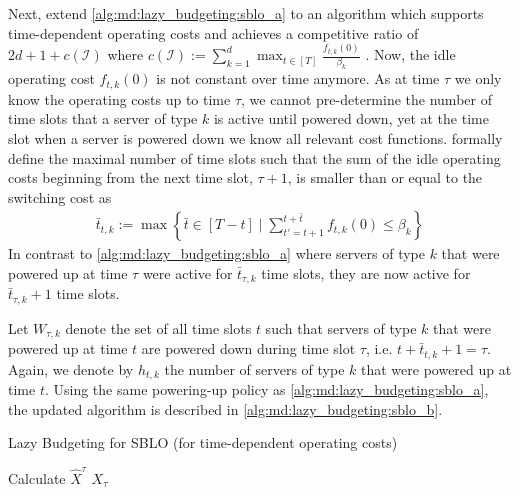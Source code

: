 Next, \citeauthor*{Albers2021_2} extend \autoref{alg:md:lazy_budgeting:sblo_a} to an algorithm which supports time-dependent operating costs and achieves a competitive ratio of $2d + 1 + c(\mathcal{I})$ where $c(\mathcal{I}) := \sum_{k=1}^d \max_{t \in [T]} \frac{f_{t,k}(0)}{\beta_k}$ \cite{Albers2021_2}. Now, the idle operating cost $f_{t,k}(0)$ is not constant over time anymore. As at time $\tau$ we only know the operating costs up to time $\tau$, we cannot pre-determine the number of time slots that a server of type $k$ is active until powered down, yet at the time slot when a server is powered down we know all relevant cost functions. \citeauthor*{Albers2021_2} formally define the maximal number of time slots such that the sum of the idle operating costs beginning from the next time slot, $\tau+1$, is smaller than or equal to the switching cost as \begin{align*}
    \bar{t}_{t,k} := \max \left\{\bar{t} \in [T - t] \mid \sum_{t' = t+1}^{t+\bar{t}} f_{t,k}(0) \leq \beta_k\right\}
\end{align*} In contrast to \autoref{alg:md:lazy_budgeting:sblo_a} where servers of type $k$ that were powered up at time $\tau$ were active for $\bar{t}_{\tau,k}$ time slots, they are now active for $\bar{t}_{\tau,k} + 1$ time slots.

Let $W_{\tau,k}$ denote the set of all time slots $t$ such that servers of type $k$ that were powered up at time $t$ are powered down during time slot $\tau$, i.e. $t + \bar{t}_{t,k} + 1 = \tau$. Again, we denote by $h_{t,k}$ the number of servers of type $k$ that were powered up at time $t$. Using the same powering-up policy as \autoref{alg:md:lazy_budgeting:sblo_a}, the updated algorithm is described in \autoref{alg:md:lazy_budgeting:sblo_b}.

\begin{algorithm}
    \caption{Lazy Budgeting for SBLO (for time-dependent operating costs) \cite{Albers2021_2}}\label{alg:md:lazy_budgeting:sblo_b}
    Calculate $\hat{X}^{\tau}$\;
    \Return $X_{\tau}$\;
\end{algorithm}

